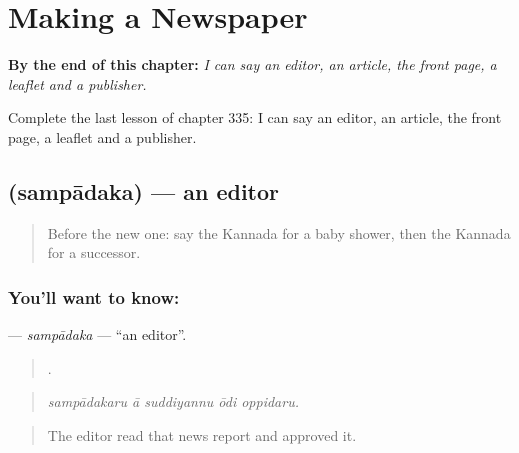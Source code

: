 
\chapter{Making a Newspaper}
\label{ch:ka-making-a-newspaper}

\begin{chapteropening}
\textbf{By the end of this chapter:} \emph{I can say an editor, an article, the front page, a leaflet and a publisher.}

Complete the last lesson of chapter 335: I can say an editor, an article, the front page, a leaflet and a publisher.
\end{chapteropening}

\section[\texorpdfstring{\kn{ಸಂಪಾದಕ} (sampādaka)}{ಸಂಪಾದಕ (sampādaka)}]{ (sampādaka) — an editor}

\label{lesson:KA-C335-sampadaka}



\begin{quote}
Before the new one: say the Kannada for a baby shower, then the Kannada for a successor.
\end{quote}

\subsection*{You'll want to know: }
\textbf{} — \emph{sampādaka} — \textquotedblleft{}an editor\textquotedblright{}.

\begin{quote}
    .
\end{quote}

\begin{quote}
\emph{sampādakaru ā suddiyannu ōdi oppidaru.}
\end{quote}

\begin{quote}
The editor read that news report and approved it.
\end{quote}

